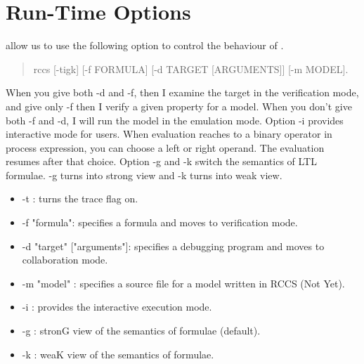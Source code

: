 \documentclass[12pt,a4paper,titlepage]{article}
\theoremstyle{break}
\begin{document}
\section{Run-Time Options}
\NHK allow us to use the following option to control the behaviour of \NHK.
  \begin{quotation}
rccs [-tigk] [-f FORMULA] [-d TARGET [ARGUMENTS]] [-m MODEL].
  \end{quotation}
When you give both -d and -f, then I examine the target in the verification mode, and give only -f then I verify a given property for a model.
When you don't give both -f and -d, I will run the model in the emulation mode.
Option -i provides interactive mode for users.
When evaluation reaches to a binary operator in process expression, you can choose a left or right operand.
The evaluation resumes after that choice.
Option -g and -k switch the semantics of LTL formulae.
-g turns into strong view and -k turns into weak view.
    \begin{itemize}
\item -t : turns the trace flag on.
\item -f "formula": specifies a formula and moves to verification mode.
\item -d "target" ["arguments"]: specifies a debugging program and moves to collaboration mode.
\item -m "model" : specifies a source file for a model written in RCCS (Not Yet).
\item -i : provides the interactive execution mode.
\item -g : stronG view of the semantics of formulae (default).
\item -k : weaK view of the semantics of formulae.
    \end{itemize}
%
%
\end{document}
